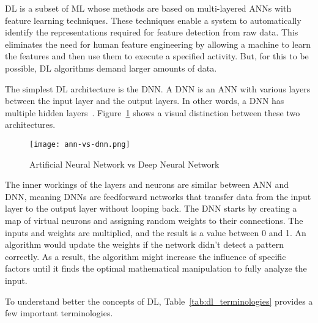 \gls{DL} is a subset of \gls{ML} whose methods are based on multi-layered \gls{ANN}s with feature learning techniques. These techniques enable a system to automatically identify the representations required for feature detection from raw data. This eliminates the need for human feature engineering by allowing a machine to learn the features and then use them to execute a specified activity. But, for this to be possible, \gls{DL} algorithms demand larger amounts of data.

The simplest \gls{DL} architecture is the \gls{DNN}. A \gls{DNN} is an \gls{ANN} with various layers between the input layer and the output layers. In other words, a \gls{DNN} has multiple hidden layers~\cite{Schmidhuber2015DeepOverview}. Figure~\ref{fig:ann-vs-dnn} shows a visual distinction between these two architectures.

\begin{figure}[htbp]
    \centering
    \texttt{[image: ann-vs-dnn.png]}
    \caption{Artificial Neural Network vs Deep Neural Network}
    \label{fig:ann-vs-dnn}
\end{figure}

The inner workings of the layers and neurons are similar between \gls{ANN} and \gls{DNN}, meaning \gls{DNN}s are feedforward networks that transfer data from the input layer to the output layer without looping back. The \gls{DNN} starts by creating a map of virtual neurons and assigning random weights to their connections. The inputs and weights are multiplied, and the result is a value between 0 and 1. An algorithm would update the weights if the network didn't detect a pattern correctly. As a result, the algorithm might increase the influence of specific factors until it finds the optimal mathematical manipulation to fully analyze the input.

To understand better the concepts of \gls{DL}, Table~\ref{tab:dl_terminologies} provides a few important terminologies.


